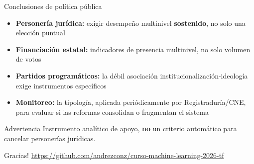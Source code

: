 \documentclass[11pt,aspectratio=169]{beamer}
\begin{document}
\begin{frame}{Conclusiones de política pública}
\begin{itemize}
  \item \textbf{Personería jurídica:} exigir desempeño multinivel \textbf{sostenido}, no solo una elección puntual
  \item \textbf{Financiación estatal:} indicadores de presencia multinivel, no solo volumen de votos
  \item \textbf{Partidos programáticos:} la débil asociación institucionalización-ideología exige instrumentos específicos
  \item \textbf{Monitoreo:} la tipología, aplicada periódicamente por Registraduría/CNE, para evaluar si las reformas consolidan o fragmentan el sistema
\end{itemize}
\vspace{0.3cm}
\begin{block}{Advertencia}
Instrumento analítico de apoyo, \textbf{no} un criterio automático para cancelar personerías jurídicas.
\end{block}
\vspace{0.3cm}
\centering \textexclamdown{}Gracias! \hspace{0.3cm} \url{https://github.com/andrezconz/curso-machine-learning-2026-tf}
\end{frame}
\end{document}
